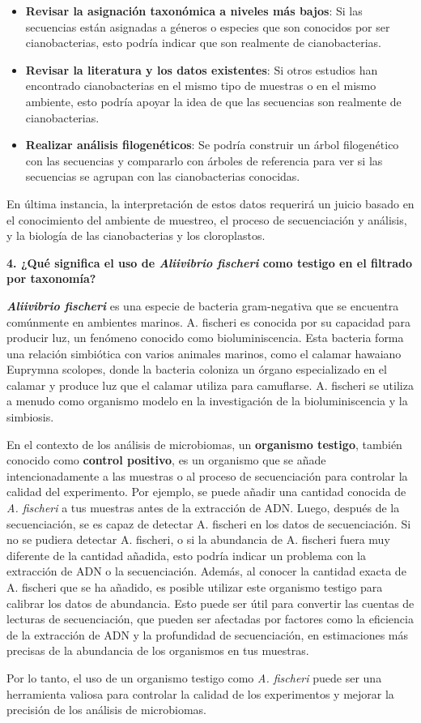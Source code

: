 \documentclass[
  letterpaper,
  DIV=11,
  numbers=noendperiod]{scrartcl}
\begin{document}
\begin{itemize}
\item
  \textbf{Revisar la asignación taxonómica a niveles más bajos}: Si las
  secuencias están asignadas a géneros o especies que son conocidos por
  ser cianobacterias, esto podría indicar que son realmente de
  cianobacterias.
\item
  \textbf{Revisar la literatura y los datos existentes}: Si otros
  estudios han encontrado cianobacterias en el mismo tipo de muestras o
  en el mismo ambiente, esto podría apoyar la idea de que las secuencias
  son realmente de cianobacterias.
\item
  \textbf{Realizar análisis filogenéticos}: Se podría construir un árbol
  filogenético con las secuencias y compararlo con árboles de referencia
  para ver si las secuencias se agrupan con las cianobacterias
  conocidas.
\end{itemize}

En última instancia, la interpretación de estos datos requerirá un
juicio basado en el conocimiento del ambiente de muestreo, el proceso de
secuenciación y análisis, y la biología de las cianobacterias y los
cloroplastos.

\textbf{4. ¿Qué significa el uso de \emph{Aliivibrio fischeri} como
testigo en el filtrado por taxonomía?}

\textbf{\emph{Aliivibrio fischeri}} es una especie de bacteria
gram-negativa que se encuentra comúnmente en ambientes marinos. A.
fischeri es conocida por su capacidad para producir luz, un fenómeno
conocido como bioluminiscencia. Esta bacteria forma una relación
simbiótica con varios animales marinos, como el calamar hawaiano
Euprymna scolopes, donde la bacteria coloniza un órgano especializado en
el calamar y produce luz que el calamar utiliza para camuflarse. A.
fischeri se utiliza a menudo como organismo modelo en la investigación
de la bioluminiscencia y la simbiosis.

En el contexto de los análisis de microbiomas, un \textbf{organismo
testigo}, también conocido como \textbf{control positivo}, es un
organismo que se añade intencionadamente a las muestras o al proceso de
secuenciación para controlar la calidad del experimento. Por ejemplo, se
puede añadir una cantidad conocida de \emph{A. fischeri} a tus muestras
antes de la extracción de ADN. Luego, después de la secuenciación, se es
capaz de detectar A. fischeri en los datos de secuenciación. Si no se
pudiera detectar A. fischeri, o si la abundancia de A. fischeri fuera
muy diferente de la cantidad añadida, esto podría indicar un problema
con la extracción de ADN o la secuenciación. Además, al conocer la
cantidad exacta de A. fischeri que se ha añadido, es posible utilizar
este organismo testigo para calibrar los datos de abundancia. Esto puede
ser útil para convertir las cuentas de lecturas de secuenciación, que
pueden ser afectadas por factores como la eficiencia de la extracción de
ADN y la profundidad de secuenciación, en estimaciones más precisas de
la abundancia de los organismos en tus muestras.

Por lo tanto, el uso de un organismo testigo como \emph{A. fischeri}
puede ser una herramienta valiosa para controlar la calidad de los
experimentos y mejorar la precisión de los análisis de microbiomas.
\end{document}
